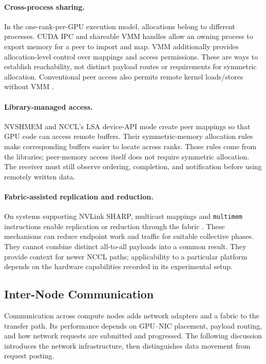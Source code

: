 \paragraph{Cross-process sharing.} In the one-rank-per-GPU execution model, allocations belong to different processes. CUDA IPC and shareable \ac{VMM} handles allow an owning process to export memory for a peer to import and map. VMM additionally provides allocation-level control over mappings and access permissions. These are ways to establish reachability, not distinct payload routes or requirements for symmetric allocation. Conventional peer access also permits remote kernel loads/stores without VMM \cite{nvidia_cuda_programming_2026}.

\paragraph{Library-managed access.} NVSHMEM and NCCL's \ac{LSA} device-API mode create peer mappings so that GPU code can access remote buffers. Their symmetric-memory allocation rules make corresponding buffers easier to locate across ranks. Those rules come from the libraries; peer-memory access itself does not require symmetric allocation. The receiver must still observe ordering, completion, and notification before using remotely written data.

\paragraph{Fabric-assisted replication and reduction.} On systems supporting NVLink \ac{SHARP}, multicast mappings and \texttt{multimem} instructions enable replication or reduction through the fabric \cite{shen_every_2026}. These mechanisms can reduce endpoint work and traffic for suitable collective phases. They cannot combine distinct all-to-all payloads into a common result. They provide context for newer NCCL paths; applicability to a particular platform depends on the hardware capabilities recorded in its experimental setup.

\subsection{Inter-Node Communication}\label{sec:inter-node}

Communication across compute nodes adds network adapters and a fabric to the transfer path. Its performance depends on GPU--NIC placement, payload routing, and how network requests are submitted and progressed. The following discussion introduces the network infrastructure, then distinguishes data movement from request posting.

